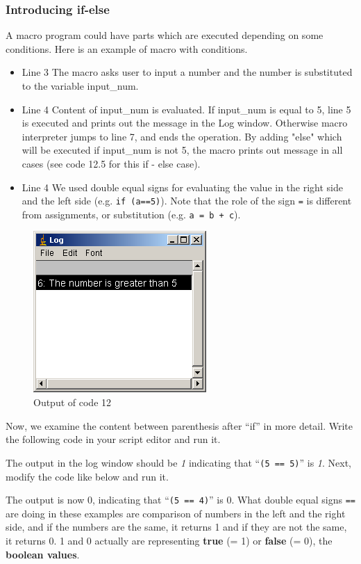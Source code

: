 \documentclass[11pt,a4paper,oneside]{report}
\newcommand{\ilcom}[1]{\texttt{\small#1}}
\begin{document}
\subsubsection{Introducing if-else}
A macro program could have parts which are executed depending on some
conditions.
Here is an example of macro with conditions.

\begin{itemize}
\item Line 3 The macro asks user to input a number and the number is substituted to the variable input\_num.
\item Line 4 Content of input\_num is evaluated. If input\_num is equal to 5, line 5 is executed and prints out the message in the Log window. Otherwise macro interpreter jumps to line 7, and ends the operation.  By adding "else" which will be executed if input\_num is not 5, the macro prints out message in all cases (see code 12.5 for this if - else case). 
\item Line 4 We used double equal signs for evaluating the value in the right side and the left side (e.g. \ilcom{if (a==5)}). 
Note that the role of the sign \ilcom{=} is different from assignments, or substitution (e.g. \ilcom{a = b + c}).
\end{itemize}
\begin{figure}[htbp]
\begin{center}
\includegraphics[scale=0.6]{fig/fig2341_code12out.png}
\caption{Output of code 12}
\label{fig:code12 output}
\end{center}
\end{figure} 

Now, we examine the content between 
parenthesis after ``if'' in more detail. 
Write the following code in your script editor and run it.

The output in the log window should be \textit{1} indicating that ``\ilcom{(5 ==
5)}'' is \textit{1}. Next, modify the code like below and run it.

The output is now 0, indicating that ``\ilcom{(5 == 4)}'' is
0.
What double equal signs \ilcom{==} are doing in these
examples are comparison of numbers in the left and the right side, and if
the numbers are the same, it returns 1 and if they are not the same, it returns 0. 1 and
0 actually are representing \textbf{true} (= 1) or \textbf{false} (= 0), the
\textbf{boolean values}.
\end{document}
